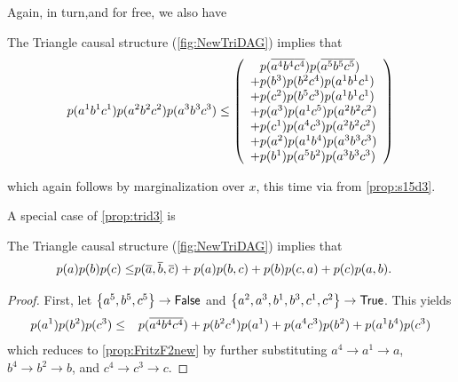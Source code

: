 Again, in turn,and for free, we also have
\begin{prop}\label{prop:trid3}
The Triangle causal structure (\cref{fig:NewTriDAG}) implies that
\begin{align*}
\p{a^1 b^1 c^1} \p{a^2 b^2 c^2} \p{a^3 b^3 c^3}
\leq
\lparens{
\hphantom{+}\p{\n{a^4} \n{b^4} \n{c^4}} \p{\n{a^5} \n{b^5} \n{c^5}}
\\+\p{b^3} \p{b^2 c^4} \p{a^1 b^1 c^1}
\\+\p{c^2} \p{b^5 c^3} \p{a^1 b^1 c^1}
\\+\p{a^3} \p{a^1 c^5} \p{a^2 b^2 c^2}
\\+\p{c^1} \p{a^4 c^3} \p{a^2 b^2 c^2}
\\+\p{a^2} \p{a^1 b^4} \p{a^3 b^3 c^3}
\\+\p{b^1} \p{a^5 b^2} \p{a^3 b^3 c^3}
}
\end{align*}
\end{prop}
which again follows by marginalization over $x$, this time via from \cref{prop:s15d3}.



A special case of \cref{prop:trid3} is
\begin{prop} \label{prop:FritzF2new}
The Triangle causal structure (\cref{fig:NewTriDAG}) implies that
\begin{align*}\begin{split}
\p{a}\p{b}\p{c}\leq&\p{\n{a},\n{b},\n{c}}+ \p{a}\p{b,c} + \p{b}\p{c,a}+ \p{c}\p{a,b}.
\end{split}\end{align*}
\end{prop}
\begin{proof}
First, let $\brackets{a^5,b^5,c^5}\to\mathsf{False}$ and $\brackets{a^2,a^3,b^1,b^3,c^1,c^2}\to\mathsf{True}$. This yields
\begin{align}
\p{a^1 } \p{b^2} \p{c^3}
\leq
{
\hphantom{+}\p{\n{a^4} \n{b^4} \n{c^4}} 
+\p{b^2 c^4} \p{a^1}
+\p{a^4 c^3} \p{b^2}
+\p{a^1 b^4} \p{c^3}
}
\end{align}
which reduces to \cref{prop:FritzF2new} by further substituting $a^4\to a^1\to a$, $b^4\to b^2\to b$, and $c^4\to c^3\to c$.
\end{proof}


